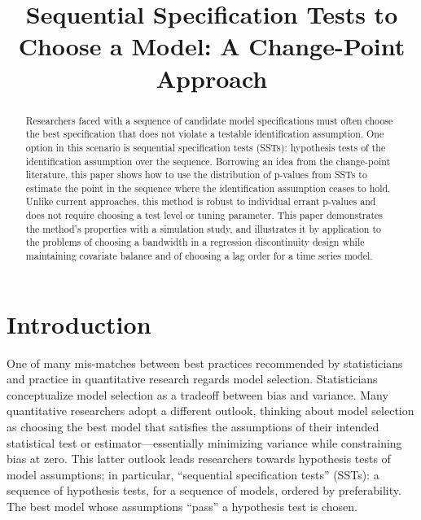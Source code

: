 \documentclass[sts]{imsart}\usepackage[]{graphicx}\usepackage[]{color}
\begin{document}
\begin{frontmatter}

\title{Sequential Specification Tests to Choose a Model: A Change-Point Approach}

\author{ \corref{}}


\begin{abstract}
Researchers faced with a sequence of candidate model specifications must often choose the best specification that does not violate a testable identification assumption. One option in this scenario is sequential specification tests (SSTs): hypothesis tests of the identification assumption over the sequence. Borrowing an idea from the change-point literature, this paper shows how to use the distribution of p-values from SSTs to estimate the point in the sequence where the identification assumption ceases to hold. Unlike current approaches, this method is robust to individual errant p-values and does not require choosing a test level or tuning parameter. This paper demonstrates the method's properties with a simulation study, and illustrates it by application to the problems of choosing a bandwidth in a regression discontinuity design while maintaining covariate balance and of choosing a lag order for a time series model.
\end{abstract}

\end{frontmatter}

\section{Introduction}

One of many mis-matches between best practices recommended by
statisticians and practice in quantitative research regards model
selection.
Statisticians conceptualize model selection as a tradeoff between bias
and variance.
Many quantitative researchers adopt a different outlook, thinking about model selection as choosing
the best model that satisfies the assumptions of their intended
statistical test or estimator---essentially minimizing variance while
constraining bias at zero.
This latter outlook leads researchers towards hypothesis tests of
model assumptions; in particular, ``sequential specification tests'' (SSTs): a sequence of hypothesis tests, for
a sequence of models, ordered by preferability.
The best model whose assumptions ``pass'' a hypothesis test is chosen.
\end{document}
